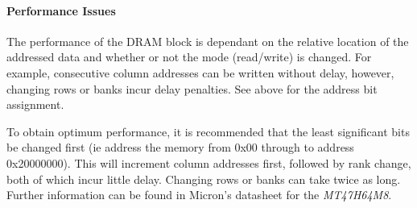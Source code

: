 \documentclass{article}
\begin{document}
{\paragraph{Performance Issues}

The performance of the DRAM block is dependant on the relative location of the addressed data and whether or not the mode (read/write) is changed. For example, consecutive column addresses can be written without delay, however, changing rows or banks incur delay penalties. See above for the address bit assignment.

To obtain optimum performance, it is recommended that the least significant bits be changed first (ie address the memory from 0x00 through to address 0x20000000). This will increment column addresses first, followed by rank change, both of which incur little delay. Changing rows or banks can take twice as long. Further information can be found in Micron's datasheet for the \textit{MT47H64M8}.



}



 
\end{document}
